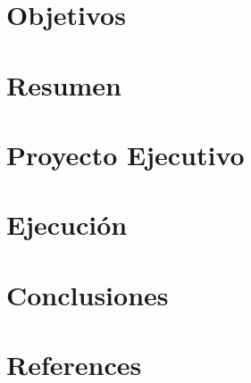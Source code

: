 \documentclass[12pt,a4paper,spanish]{article}
\begin{document}
    
%	
    
    \glsaddall
    \printnoidxglossary[style=tree,title=Glosario,nonumberlist]\label{sec:glossary}

    \newpage
    \section{Objetivos}\label{sec:objetivos}
    

    \newpage
    \section{Resumen}\label{sec:introduccion}
    

    \newpage
    \section{Proyecto Ejecutivo}\label{sec:proyecto_ejecutivo}
    

    \newpage
    \section{Ejecución}\label{sec:ejecucion}
    
%		

    \newpage
    \section{Conclusiones}\label{sec:conclusiones}
    

    \section{References}\label{sec:references}
\end{document}
